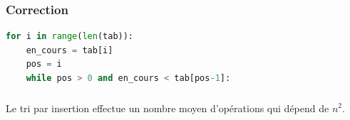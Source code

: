 \documentclass[svgnames,11pt]{beamer}
\begin{document}
\begin{frame}[fragile]
    \frametitle{Correction}

\begin{center}
\begin{lstlisting}[language=Python, basicstyle=\small, xrightmargin=1em]
for i in range(len(tab)):
    en_cours = tab[i]
    pos = i
    while pos > 0 and en_cours < tab[pos-1]:
\end{lstlisting}
\end{center}
    \begin{center}
        \label{CODE}
        \end{center}

\end{frame}
\begin{frame}
    \frametitle{}

    \begin{aretenir}[]
        Le tri par insertion effectue un nombre moyen d'opérations qui dépend de $n^2$.
    \end{aretenir}
\end{frame}
\end{document}
